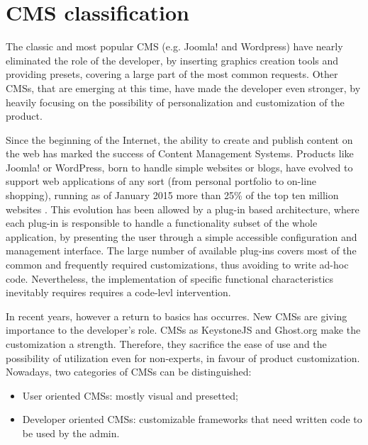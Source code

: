 \section{CMS classification}
\label{sec:CMS_class}

The classic and most popular CMS (e.g. Joomla! and Wordpress) have nearly eliminated the role of the developer, by inserting graphics creation tools and providing presets, covering a large part of the most common requests. Other CMSs, that are emerging at this time, have made the developer even stronger, by heavily focusing on the possibility of personalization and customization of the product.

Since the beginning of the Internet, the ability to create and publish content on the web has marked the success of Content Management Systems. Products like Joomla! or WordPress, born to handle simple websites or blogs, have evolved to support web applications of any sort (from personal portfolio to on-line shopping), running as of January 2015 more than 25\% of the top ten million websites \cite{cms_stats}. This evolution has been allowed by a plug-in based architecture, where each plug-in is responsible to handle a functionality subset of the whole application, by presenting the user through a simple accessible configuration and management interface.
The large number of available plug-ins covers most of the common and frequently required customizations, thus avoiding to write ad-hoc code. Nevertheless, the implementation of specific functional characteristics inevitably requires requires a code-levl intervention.

In recent years, however a return to basics has occurres. New CMSs are giving importance to the developer's role. CMSs as KeystoneJS and Ghost.org make the customization a strength.
Therefore, they sacrifice the ease of use and the possibility of utilization even for non-experts, in favour of product customization.
Nowadays, two categories of CMSs can be distinguished:
\begin{itemize}
\item User oriented CMSs: mostly visual and presetted;
\item Developer oriented CMSs: customizable frameworks that need written code to be used by the admin.
\end{itemize}